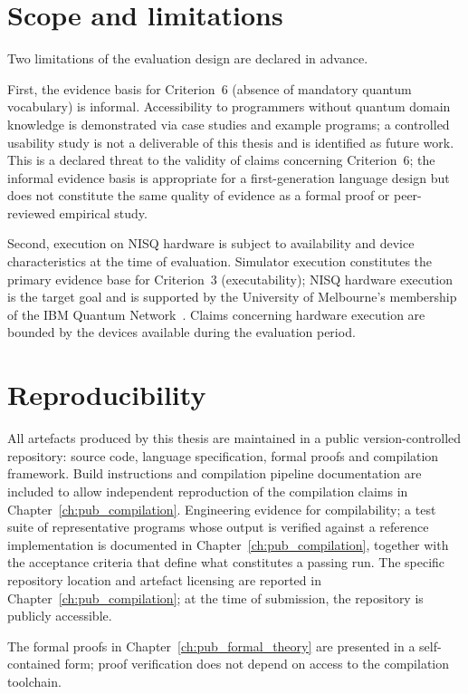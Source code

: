 \section{Scope and limitations}\label{sec:methodology:scope}
Two limitations of the evaluation design are declared in advance.

First, the evidence basis for Criterion~6 (absence of mandatory quantum vocabulary) is informal.
Accessibility to programmers without quantum domain knowledge is demonstrated via case studies and example programs; a controlled usability study is not a deliverable of this thesis and is identified as future work.
This is a declared threat to the validity of claims concerning Criterion~6; the informal evidence basis is appropriate for a first-generation language design but does not constitute the same quality of evidence as a formal proof or peer-reviewed empirical study.

Second, execution on NISQ hardware is subject to availability and device characteristics at the time of evaluation.
Simulator execution constitutes the primary evidence base for Criterion~3 (executability); NISQ hardware execution is the target goal and is supported by the University of Melbourne's membership of the IBM Quantum Network~\cite{UoMIBMQuantumHub}.
Claims concerning hardware execution are bounded by the devices available during the evaluation period.


\section{Reproducibility}\label{sec:methodology:reproducibility}
All artefacts produced by this thesis are maintained in a public version-controlled repository: source code, language specification, formal proofs and compilation framework.
Build instructions and compilation pipeline documentation are included to allow independent reproduction of the compilation claims in Chapter~\ref{ch:pub_compilation}.
Engineering evidence for compilability; a test suite of representative programs whose output is verified against a reference implementation is documented in Chapter~\ref{ch:pub_compilation}, together with the acceptance criteria that define what constitutes a passing run.
The specific repository location and artefact licensing are reported in Chapter~\ref{ch:pub_compilation}; at the time of submission, the repository is publicly accessible.

The formal proofs in Chapter~\ref{ch:pub_formal_theory} are presented in a self-contained form; proof verification does not depend on access to the compilation toolchain.
